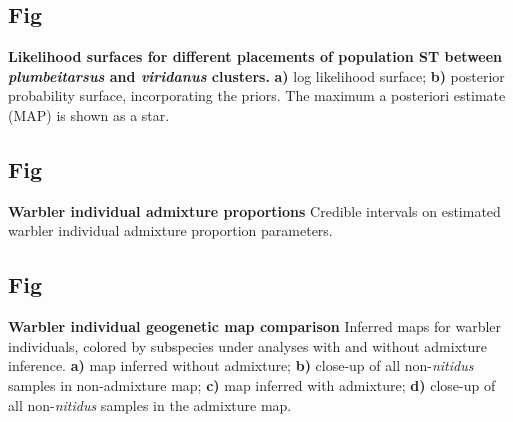 \documentclass[10pt,letterpaper]{article}
\begin{document}
\subsection{Fig}
\label{sfig:admix_prop_func_loc}
{\bf{
Likelihood surfaces for different placements of population ST between \textit{plumbeitarsus} and \textit{viridanus} clusters.}}
\textbf{a)} log likelihood surface; 
\textbf{b)} posterior probability surface, incorporating the priors. 
The maximum a posteriori estimate (MAP) is shown as a star. 

\subsection{Fig}
\label{sfig:warb_ind_adprops}
{\bf{Warbler individual admixture proportions}}
Credible intervals on estimated warbler individual admixture proportion parameters.

\subsection{Fig}
\label{sfig:warbler_ind_maps_compare}
{\bf{Warbler individual geogenetic map comparison}}
 Inferred maps for warbler individuals, colored by subspecies under analyses with and without admixture inference. 
	\textbf{a)}
	map inferred without admixture; 
	\textbf{b)} 
	close-up of all non-\textit{nitidus} samples in non-admixture map; 
	\textbf{c)}
	map inferred with admixture; 
	\textbf{d)} 
	close-up of all non-\textit{nitidus} samples in the admixture map.

\end{document}
